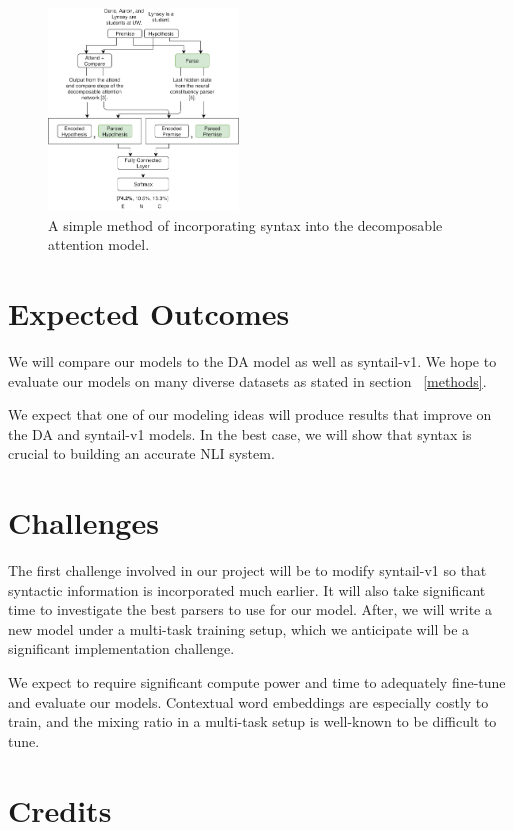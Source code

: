 \documentclass[11pt,a4paper]{article}
\begin{document}
\begin{figure}[h]
  \includegraphics[width=0.45\textwidth]{v1}
  \caption{A simple method of incorporating syntax into the decomposable
    attention model.}
\label{figure:v1}
\end{figure}

\section{Expected Outcomes}

We will compare our models to the DA model as well as syntail-v1. We hope to
evaluate our models on many diverse datasets as stated in section
~\ref{methods}.

We expect that one of our modeling ideas will produce results that improve on
the DA and syntail-v1 models. In the best case, we will show that syntax is
crucial to building an accurate NLI system.

\section{Challenges}

The first challenge involved in our project will be to modify syntail-v1
so that syntactic information is incorporated much earlier. It will also take
significant time to investigate the best parsers to use for our model.
After, we will write a new model under a multi-task training setup, which we
anticipate will be a significant implementation challenge.

We expect to require significant compute power and time to adequately fine-tune
and evaluate our models. Contextual word embeddings are especially costly to
train, and the mixing ratio in a multi-task setup is well-known to be
difficult to tune.

\section{Credits}



\end{document}
